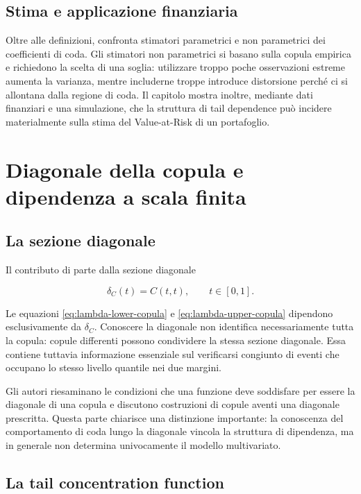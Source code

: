 \documentclass[12pt,a4paper,oneside]{book}
\begin{document}
\subsection{Stima e applicazione finanziaria}

Oltre alle definizioni, \textcite{schmidt2005} confronta stimatori parametrici
e non parametrici dei coefficienti di coda. Gli stimatori non parametrici si
basano sulla copula empirica e richiedono la scelta di una soglia: utilizzare
troppo poche osservazioni estreme aumenta la varianza, mentre includerne troppe
introduce distorsione perché ci si allontana dalla regione di coda. Il capitolo
mostra inoltre, mediante dati finanziari e una simulazione, che la struttura di
tail dependence può incidere materialmente sulla stima del Value-at-Risk di un
portafoglio.

\section{Diagonale della copula e dipendenza a scala finita}

\subsection{La sezione diagonale}

Il contributo di \textcite{duranteEtAl2015} parte dalla sezione diagonale

\begin{equation}
    \delta_C(t)=C(t,t), \qquad t\in[0,1].
    \label{eq:diagonal-section}
\end{equation}

Le equazioni \eqref{eq:lambda-lower-copula} e
\eqref{eq:lambda-upper-copula} dipendono esclusivamente da
$\delta_C$. Conoscere la diagonale non identifica necessariamente tutta la
copula: copule differenti possono condividere la stessa sezione diagonale.
Essa contiene tuttavia informazione essenziale sul verificarsi congiunto di
eventi che occupano lo stesso livello quantile nei due margini.

Gli autori riesaminano le condizioni che una funzione deve soddisfare per
essere la diagonale di una copula e discutono costruzioni di copule aventi una
diagonale prescritta. Questa parte chiarisce una distinzione importante: la
conoscenza del comportamento di coda lungo la diagonale vincola la struttura
di dipendenza, ma in generale non determina univocamente il modello
multivariato.

\subsection{La tail concentration function}
\end{document}
